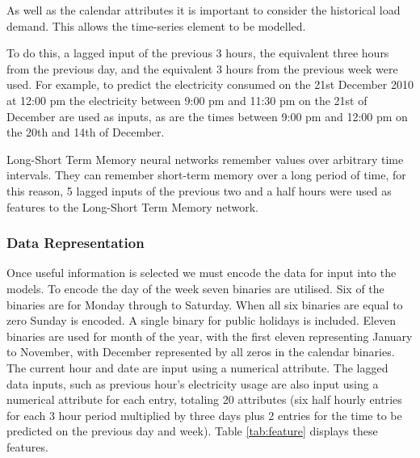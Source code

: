 As well as the calendar attributes it is important to consider the historical load demand. This allows the time-series element to be modelled.  

To do this, a lagged input of the previous 3 hours, the equivalent three hours from the previous day, and the equivalent 3 hours from the previous week were used. For example, to predict the electricity consumed on the 21st December 2010 at 12:00 pm the electricity between 9:00 pm and 11:30 pm on the 21st of December are used as inputs, as are the times between 9:00 pm and 12:00 pm on the 20th and 14th of December.

Long-Short Term Memory neural networks remember values over arbitrary time intervals. They can remember short-term memory over a long period of time, for this reason, 5 lagged inputs of the previous two and a half hours were used as features to the Long-Short Term Memory network.

\subsubsection{Data Representation}

Once useful information is selected we must encode the data for input into the models. To encode the day of the week seven binaries are utilised. Six of the binaries are for Monday through to Saturday. When all six binaries are equal to zero Sunday is encoded. A single binary for public holidays is included. Eleven binaries are used for month of the year, with the first eleven representing January to November, with December represented by all zeros in the calendar binaries. The current hour and date are input using a numerical attribute. The lagged data inputs, such as previous hour's electricity usage are also input using a numerical attribute for each entry, totaling 20 attributes (six half hourly entries for each 3 hour period multiplied by three days plus 2 entries for the time to be predicted on the previous day and week). Table \ref{tab:feature} displays these features.


